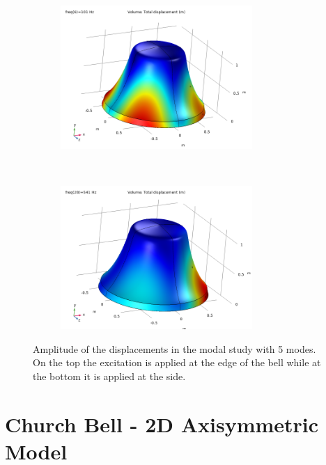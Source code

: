 \documentclass[a4paper]{article}
\begin{document}
\begin{figure}[h!]
	\begin{subfigure}{0.47\textwidth}
		\includegraphics[width=0.8\textwidth]{frequency modal study side/A1.png}
	\end{subfigure}
	~
	\begin{subfigure}{0.47\textwidth}
		\includegraphics[width=0.8\textwidth]{frequency modal study side/A2.png}
	\end{subfigure}
	\caption{Amplitude of the displacements in the modal study with 5 modes. On the top the excitation is applied at the edge of the bell while at the bottom it is applied at the side.}
	\label{fig:5modes}
\end{figure}

\section{Church Bell - 2D Axisymmetric Model}
\end{document}
